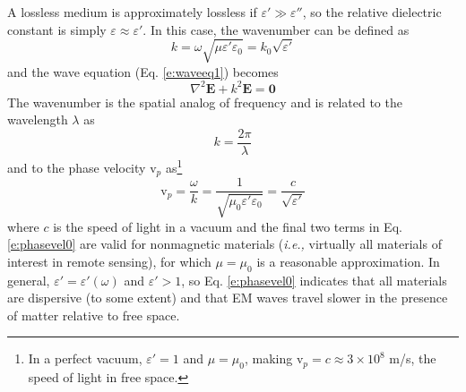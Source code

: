 \documentclass[11pt, oneside]{article}
\begin{document}
A lossless medium is approximately lossless if $\varepsilon' \gg \varepsilon''$, so the relative dielectric constant is simply $\varepsilon \approx \varepsilon'$. In this case, the wavenumber can be defined as
	\begin{equation}
	\label{e:k1}
	k = \omega\sqrt{\mu\varepsilon'\varepsilon_0} = k_0\sqrt{\varepsilon'}
	\end{equation}
 and the wave equation (Eq. \ref{e:waveeq1}) becomes
 	\begin{equation}
	\label{e:waveeq2}
	\nabla^2\mathbf{E} + k^2\mathbf{E} = \mathbf{0}
	\end{equation} 
The wavenumber is the spatial analog of frequency and is related to the wavelength $\lambda$ as
	\begin{equation}
	k = \frac{2\pi}{\lambda}
	\end{equation}
and to the phase velocity $\mathrm{v}_p$ as\footnote{In a perfect vacuum, $\varepsilon' = 1$ and $\mu = \mu_0$, making $\mathrm{v}_p = c \approx 3\times10^8$ m/s, the speed of light in free space.}
	\begin{equation}
	\label{e:phasevel0}
	\mathrm{v}_p = \frac{\omega}{k} = \frac{1}{\sqrt{\mu_0\varepsilon'\varepsilon_0}} = \frac{c}{\sqrt{\varepsilon'}}
	\end{equation} 
where $c$ is the speed of light in a vacuum and the final two terms in Eq. \ref{e:phasevel0} are valid for nonmagnetic materials (\emph{i.e.,} virtually all materials of interest in remote sensing), for which $\mu=\mu_0$ is a reasonable approximation. In general, $\varepsilon' = \varepsilon'(\omega)$ and $\varepsilon' > 1$, so Eq. \ref{e:phasevel0} indicates that all materials are dispersive (to some extent) and that EM waves travel slower in the presence of matter relative to free space.
\end{document}
